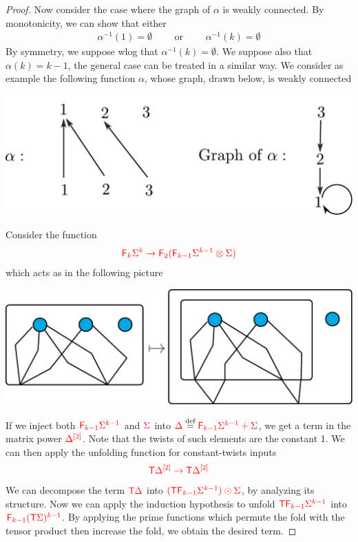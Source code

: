 \begin{proof}
Now consider the case where the graph of $\alpha$ is weakly connected. By monotonicity, we can show that either
\begin{align*}
\alpha^{-1}(1)=\emptyset\qquad\text{ or }\qquad\alpha^{-1}(k)=\emptyset
\end{align*}
By symmetry, we suppose wlog that $\alpha^{-1}(k)=\emptyset$. We suppose also that $\alpha(k)=k-1$, the general case can be treated in a similar way.
We consider as example the following function $\alpha$, whose graph, drawn below, is weakly connected
\begin{center}
\includegraphics[scale=.4]{pictures/graph-of-alpha}
\end{center}
Consider the function
\begin{align*}
{\color{red}{{\color{red}{\mathsf F_{k}}}\Sigma^k \to {\color{red}{\mathsf F_{2}}}({\color{red}{\mathsf F_{k-1}}}\Sigma^{k-1}\otimes \Sigma)}}
\end{align*}
which acts as in the following picture
\begin{center}
\includegraphics[scale=.4]{pictures/connected-alpha-hom}
\end{center}
If we inject both ${\color{red}{{\color{red}{\mathsf F_{k-1}}}\Sigma^{k-1}}}$ and ${\color{red}{\Sigma}}$ into ${\color{red}{\Delta}}\stackrel{\text{def}}={\color{red}{{\color{red}{\mathsf F_{k-1}}}\Sigma^{k-1}+\Sigma}}$, we get a term in the matrix power ${\color{red}{\Delta}}^{{\color{red}{[2]}}}$. Note that the twists of such elements are the constant 1. We can then apply the unfolding function for constant-twists inputs
\begin{align*}
{\color{red}{{\color{red}{\mathsf T}}\Delta^{{\color{red}{[2]}}} \to {\color{red}{\mathsf T}}\Delta^{{\color{red}{[2]}}}}}
\end{align*}
We can decompose the term ${\color{red}{\mathsf T}} {\color{red}{\Delta}}$ into  ${\color{red}{({\color{red}{\mathsf T}}{\color{red}{\mathsf F_{k-1}}}\Sigma^{k-1})\odot \Sigma}}$, by analyzing its structure. Now we can apply the induction hypothesis to unfold  ${\color{red}{{\color{red}{\mathsf T}}{\color{red}{\mathsf F_{k-1}}}\Sigma^{k-1}}}$ into ${\color{red}{{\color{red}{\mathsf F_{k-1}}}({\color{red}{\mathsf T}}\Sigma)^{k-1}}}$. By applying the prime functions which permute the fold with the tensor product then increase the fold, we obtain the desired term.
\end{proof}


